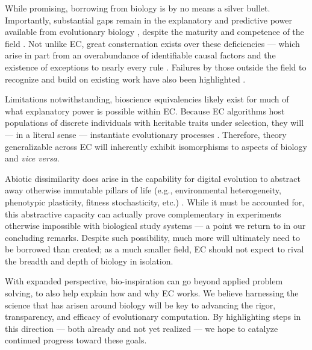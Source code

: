 



While promising, borrowing from biology is by no means a silver bullet.
Importantly, substantial gaps remain in the explanatory and predictive power available from evolutionary biology \citep{houlahan2016priority,catford2022addressing,yates2018outstanding}, despite the maturity and competence of the field \citep{lynch2025complexity}.
Not unlike EC, great consternation exists over these deficiencies --- which arise in part from an overabundance of identifiable causal factors and the existence of exceptions to nearly every rule \citep{welch2016whats}.
Failures by those outside the field to recognize and build on existing work have also been highlighted \citep{lynch2025complexity,beer2024alife}.

Limitations notwithstanding, bioscience equivalencies likely exist for much of what explanatory power is possible within EC.
Because EC algorithms host populations of discrete individuals with heritable traits under selection, they will --- in a literal sense --- instantiate evolutionary processes \citep{pennock2007models,lewontin1970units}.
Therefore, theory generalizable across EC will inherently exhibit isomorphisms to aspects of biology and \textit{vice versa}.

Abiotic dissimilarity does arise in the capability for digital evolution to abstract away otherwise immutable pillars of life (e.g., environmental heterogeneity, phenotypic plasticity, fitness stochasticity, etc.) \citep{belew1996computation}.
While it must be accounted for, this abstractive capacity can actually prove complementary in experiments otherwise impossible with biological study systems \citep{dolson2021digital} --- a point we return to in our concluding remarks.
Despite such possibility, much more will ultimately need to be borrowed than created; as a much smaller field, EC should not expect to rival the breadth and depth of biology in isolation.

With expanded perspective, bio-inspiration can go beyond applied problem solving, to also help explain how and why EC works.
We believe harnessing the science that has arisen around biology will be key to advancing the rigor, transparency, and efficacy of evolutionary computation.
By highlighting steps in this direction --- both already and not yet realized --- we hope to catalyze continued progress toward these goals.
